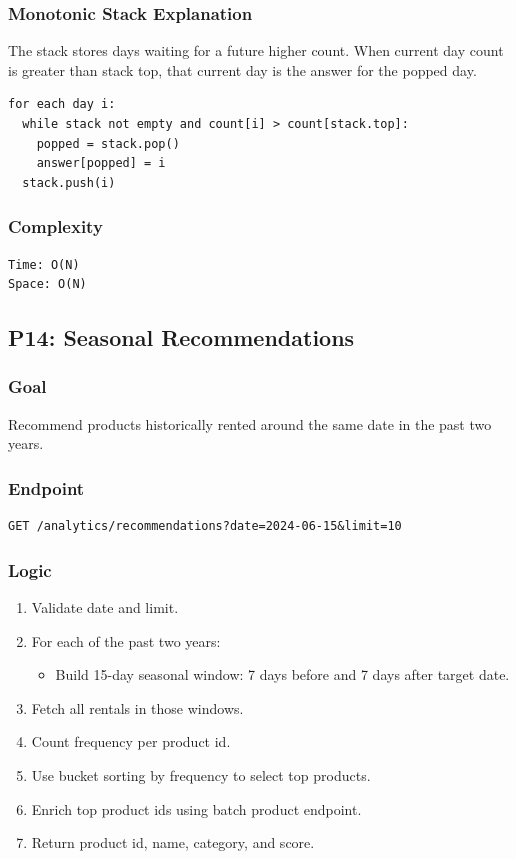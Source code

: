 \documentclass[11pt,a4paper]{article}
\begin{document}
\subsubsection*{Monotonic Stack Explanation}

The stack stores days waiting for a future higher count. When current day count is greater than stack top, that current day is the answer for the popped day.

\begin{lstlisting}
for each day i:
  while stack not empty and count[i] > count[stack.top]:
    popped = stack.pop()
    answer[popped] = i
  stack.push(i)
\end{lstlisting}

\subsubsection*{Complexity}

\begin{lstlisting}
Time: O(N)
Space: O(N)
\end{lstlisting}

\subsection{P14: Seasonal Recommendations}

\subsubsection*{Goal}
Recommend products historically rented around the same date in the past two years.

\subsubsection*{Endpoint}

\begin{lstlisting}
GET /analytics/recommendations?date=2024-06-15&limit=10
\end{lstlisting}

\subsubsection*{Logic}

\begin{enumerate}
  \item Validate date and limit.
  \item For each of the past two years:
  \begin{itemize}
    \item Build 15-day seasonal window: 7 days before and 7 days after target date.
  \end{itemize}
  \item Fetch all rentals in those windows.
  \item Count frequency per product id.
  \item Use bucket sorting by frequency to select top products.
  \item Enrich top product ids using batch product endpoint.
  \item Return product id, name, category, and score.
\end{enumerate}
\end{document}
